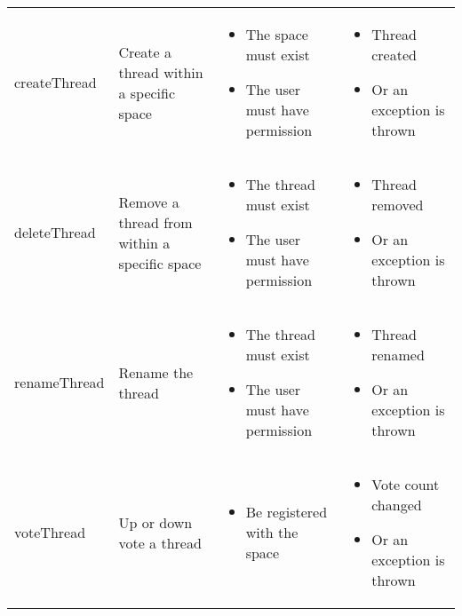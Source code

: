 \documentclass{report}
\begin{document}
\begin{longtable}{@{}|p{2.5cm}|p{3cm}|p{4cm}|p{4cm}|@{}}
			&             &                &                 \\ \midrule
			
			createThread& Create a thread within a specific space& \begin{itemize} \item The space must exist \item The user must have permission \end{itemize}& \begin{itemize} \item Thread created \item Or an exception is thrown \end{itemize} \\ \midrule
			
			deleteThread& Remove a thread from within a specific space& \begin{itemize} \item The thread must exist \item The user must have permission \end{itemize}& \begin{itemize} \item Thread removed \item Or an exception is thrown \end{itemize} \\ \midrule
			
			renameThread& Rename the thread& \begin{itemize} \item The thread must exist \item The user must have permission \end{itemize}& \begin{itemize} \item Thread renamed \item Or an exception is thrown \end{itemize} \\ \midrule
			
			voteThread& Up or down vote a thread& \begin{itemize} \item Be registered with the space \end{itemize}& \begin{itemize} \item Vote count changed \item Or an exception is thrown \end{itemize} \\ \midrule
			

\end{longtable}
\end{document}
